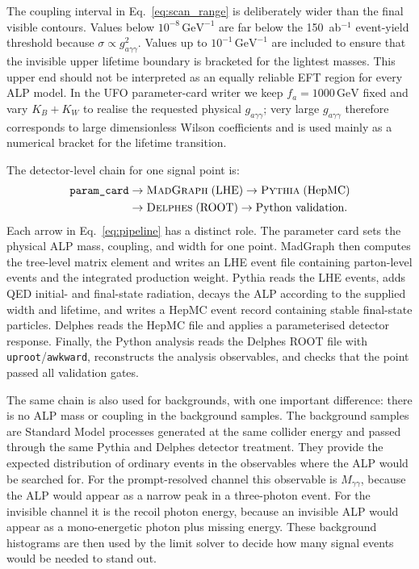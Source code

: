 \documentclass[12pt,a4paper]{article}
\newcommand{\gagg}{g_{a\gamma\gamma}}
\newcommand{\GeV}{\,\text{GeV}}
\begin{document}
The coupling interval in Eq.~\eqref{eq:scan_range} is deliberately wider than
the final visible contours. Values below $10^{-8}\GeV^{-1}$ are far below the
150~ab$^{-1}$ event-yield threshold because
$\sigma\propto\gagg^2$. Values up to $10^{-1}\GeV^{-1}$ are included to ensure
that the invisible upper lifetime boundary is bracketed for the lightest
masses. This upper end should not be interpreted as an equally reliable EFT
region for every ALP model. In the UFO parameter-card writer we keep
$f_a=1000\GeV$ fixed and vary $K_B+K_W$ to realise the requested physical
$\gagg$; very large $\gagg$ therefore corresponds to large dimensionless
Wilson coefficients and is used mainly as a numerical bracket for the
lifetime transition.

The detector-level chain for one signal point is:
\begin{equation}
    \begin{aligned}
    \texttt{param\_card}
    &\to \textsc{MadGraph}\;(\text{LHE})
    \to \textsc{Pythia}\;(\text{HepMC})\\
    &\to \textsc{Delphes}\;(\text{ROOT})
    \to \text{Python validation}.
    \end{aligned}
    \label{eq:pipeline}
\end{equation}
Each arrow in Eq.~\eqref{eq:pipeline} has a distinct role. The parameter card
sets the physical ALP mass, coupling, and width for one point. MadGraph then
computes the tree-level matrix element and writes an LHE event file containing
parton-level events and the integrated production weight. Pythia reads the LHE
events, adds QED initial- and final-state radiation, decays the ALP according to
the supplied width and lifetime, and writes a HepMC event record containing
stable final-state particles. Delphes reads the HepMC file and applies a
parameterised detector response. Finally, the Python analysis reads the Delphes
ROOT file with \texttt{uproot}/\texttt{awkward}, reconstructs the analysis
observables, and checks that the point passed all validation gates.

The same chain is also used for backgrounds, with one important difference:
there is no ALP mass or coupling in the background samples. The background
samples are Standard Model processes generated at the same collider energy and
passed through the same Pythia and Delphes detector treatment. They provide the
expected distribution of ordinary events in the observables where the ALP would
be searched for. For the prompt-resolved channel this observable is
$M_{\gamma\gamma}$, because the ALP would appear as a narrow peak in a
three-photon event. For the invisible channel it is the recoil photon energy,
because an invisible ALP would appear as a mono-energetic photon plus missing
energy. These background histograms are then used by the limit solver to decide
how many signal events would be needed to stand out.
\end{document}
